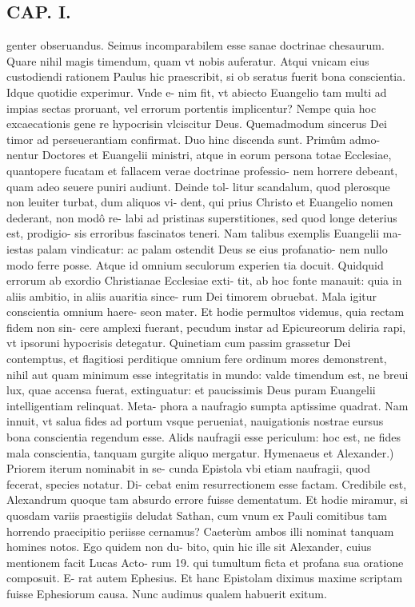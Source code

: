 \documentclass{article}
\begin{document}
\begin{pages}
\section*{CAP. I. }
\marginpar{[ p.15 ]}\pstart genter obseruandus. Seimus incomparabilem esse sanae doctrinae chesaurum. Quare nihil magis timendum, quam vt nobis auferatur. Atqui vnicam eius custodiendi rationem Paulus hic praescribit, si ob seratus fuerit bona conscientia. Idque quotidie experimur. Vnde e- nim fit, vt abiecto Euangelio tam multi ad impias sectas proruant, vel errorum portentis implicentur? Nempe quia hoc excaecationis gene re hypocrisin vlciscitur Deus. Quemadmodum sincerus Dei timor ad perseuerantiam confirmat. Duo hinc discenda sunt. Primûm admo- nentur Doctores et Euangelii ministri, atque in eorum persona totae Ecclesiae, quantopere fucatam et fallacem verae doctrinae professio- nem horrere debeant, quam adeo seuere puniri audiunt. Deinde tol- litur scandalum, quod plerosque non leuiter turbat, dum aliquos vi- dent, qui prius Christo et Euangelio nomen dederant, non modô re- labi ad pristinas superstitiones, sed quod longe deterius est, prodigio- sis erroribus fascinatos teneri. Nam talibus exemplis Euangelii ma- iestas palam vindicatur: ac palam ostendit Deus se eius profanatio- nem nullo modo ferre posse. Atque id omnium seculorum experien tia docuit. Quidquid errorum ab exordio Christianae Ecclesiae exti- tit, ab hoc fonte manauit: quia in aliis ambitio, in aliis auaritia since- rum Dei timorem obruebat. Mala igitur conscientia omnium haere- seon mater. Et hodie permultos videmus, quia rectam fidem non sin- cere amplexi fuerant, pecudum instar ad Epicureorum deliria rapi, vt ipsoruni hypocrisis detegatur. Quinetiam cum passim grassetur Dei contemptus, et flagitiosi perditique omnium fere ordinum mores demonstrent, nihil aut quam minimum esse integritatis in mundo: valde timendum est, ne breui lux, quae accensa fuerat, extinguatur: et paucissimis Deus puram Euangelii intelligentiam relinquat. Meta- phora a naufragio sumpta aptissime quadrat. Nam innuit, vt salua fides ad portum vsque perueniat, nauigationis nostrae eursus bona conscientia regendum esse. Alids naufragii esse periculum: hoc est, ne fides mala conscientia, tanquam gurgite aliquo mergatur.  \pend\pstart Hymenaeus et Alexander.) Priorem iterum nominabit in se- cunda Epistola vbi etiam naufragii, quod fecerat, species notatur. Di- cebat enim resurrectionem esse factam. Credibile est, Alexandrum quoque tam absurdo errore fuisse dementatum. Et hodie miramur, si quosdam variis praestigiis deludat Sathan, cum vnum ex Pauli comitibus tam horrendo praecipitio periisse cernamus? Caeterùm ambos illi nominat tanquam homines notos. Ego quidem non du- bito, quin hic ille sit Alexander, cuius mentionem facit Lucas Acto- rum 19. qui tumultum ficta et profana sua oratione composuit. E- rat autem Ephesius. Et hanc Epistolam diximus maxime scriptam fuisse Ephesiorum causa. Nunc audimus qualem habuerit exitum.  \pend

\end{pages}
\end{document}
